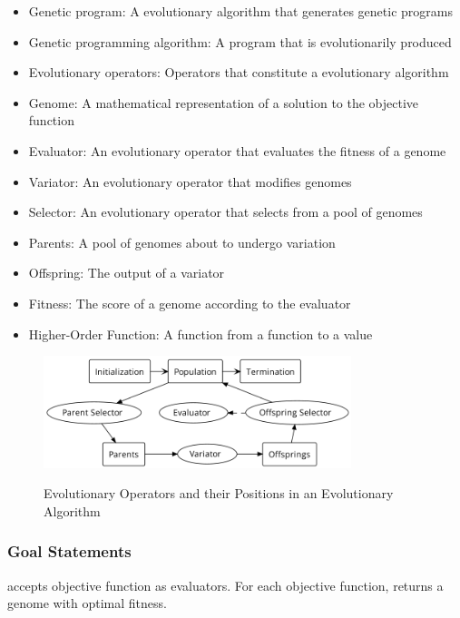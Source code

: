 \documentclass[12pt]{article}
\begin{document}
\begin{itemize}
  \item Genetic program: A evolutionary algorithm that generates genetic programs
  \item Genetic programming algorithm: A program that is evolutionarily produced
  \item Evolutionary operators: Operators that constitute a evolutionary algorithm
  \item Genome: A mathematical representation of a solution to the objective function
  \item Evaluator: An evolutionary operator that evaluates the fitness of a genome
  \item Variator: An evolutionary operator that modifies genomes
  \item Selector: An evolutionary operator that selects from a pool of genomes
  \item Parents: A pool of genomes about to undergo variation
  \item Offspring: The output of a variator
  \item Fitness: The score of a genome according to the evaluator
  \item Higher-Order Function: A function from a function to a value
\end{itemize}



\begin{figure}[ht]
	\begin{center}
		{
			\includegraphics[width=0.8\textwidth]{pasta}
		}
		\caption{\label{fig:evoalg} Evolutionary Operators and their Positions in an Evolutionary Algorithm}
	\end{center}
\end{figure}


\subsubsection{Goal Statements}

\thisproject{} accepts objective function as evaluators. For each objective function, \thisproject{} returns a genome with optimal fitness.
\end{document}
